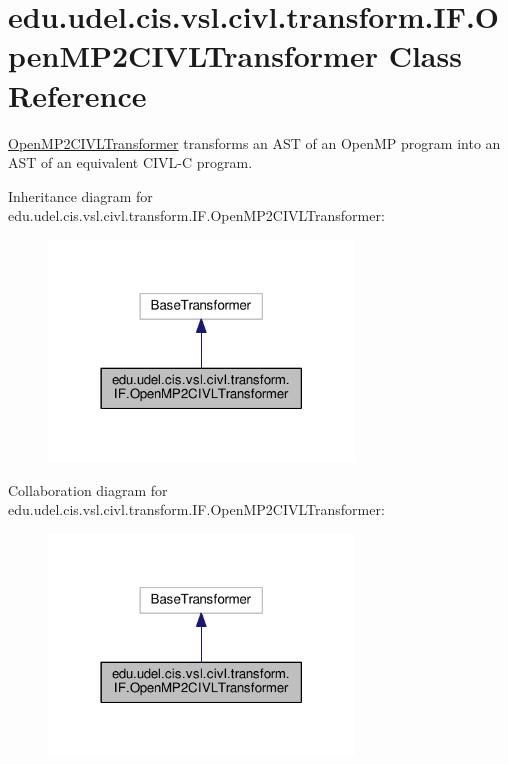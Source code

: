 \hypertarget{classedu_1_1udel_1_1cis_1_1vsl_1_1civl_1_1transform_1_1IF_1_1OpenMP2CIVLTransformer}{}\section{edu.\+udel.\+cis.\+vsl.\+civl.\+transform.\+I\+F.\+Open\+M\+P2\+C\+I\+V\+L\+Transformer Class Reference}
\label{classedu_1_1udel_1_1cis_1_1vsl_1_1civl_1_1transform_1_1IF_1_1OpenMP2CIVLTransformer}


\hyperlink{classedu_1_1udel_1_1cis_1_1vsl_1_1civl_1_1transform_1_1IF_1_1OpenMP2CIVLTransformer}{Open\+M\+P2\+C\+I\+V\+L\+Transformer} transforms an A\+S\+T of an Open\+M\+P program into an A\+S\+T of an equivalent C\+I\+V\+L-\/\+C program.  




Inheritance diagram for edu.\+udel.\+cis.\+vsl.\+civl.\+transform.\+I\+F.\+Open\+M\+P2\+C\+I\+V\+L\+Transformer\+:
\nopagebreak
\begin{figure}[H]
\begin{center}
\leavevmode
\includegraphics[width=230pt]{classedu_1_1udel_1_1cis_1_1vsl_1_1civl_1_1transform_1_1IF_1_1OpenMP2CIVLTransformer__inherit__graph}
\end{center}
\end{figure}


Collaboration diagram for edu.\+udel.\+cis.\+vsl.\+civl.\+transform.\+I\+F.\+Open\+M\+P2\+C\+I\+V\+L\+Transformer\+:
\nopagebreak
\begin{figure}[H]
\begin{center}
\leavevmode
\includegraphics[width=230pt]{classedu_1_1udel_1_1cis_1_1vsl_1_1civl_1_1transform_1_1IF_1_1OpenMP2CIVLTransformer__coll__graph}
\end{center}
\end{figure}
